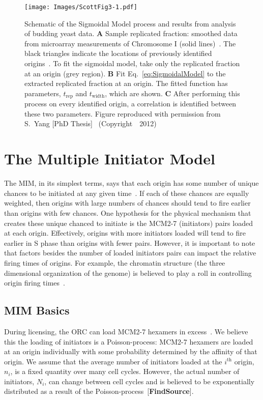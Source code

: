 {	\begin{figure}[tbh]
		\begin{center}
			\texttt{[image: Images/ScottFig3-1.pdf]}
		\end{center}
			\caption[Sigmoidal model]{\label{fig:SigmoidalModel} Schematic of the Sigmoidal Model process and results from analysis of budding yeast data.
				\textbf{A} Sample replicated fraction: smoothed data from microarray measurements of Chromosome I (solid lines)~\cite{McCuneMicroArray}.
				The black triangles indicate the locations of previously identified origins~\cite{OriginLocations}.
				To fit the sigmoidal model, take only the replicated fraction at an origin (grey region).
				\textbf{B} Fit Eq.~\ref{eq:SigmoidalModel} to the extracted replicated fraction at an origin.
				The fitted function has parameters, $t_{\text{rep}}$ and $t_{\text{width}}$, which are shown.
				\textbf{C} After performing this process on every identified origin, a correlation is identified between these two parameters.
				Figure reproduced with permission from S.~Yang [PhD Thesis]~\cite{ScottsThesis} (Copyright~\textcopyright~2012)}
	\end{figure}
	
	
	\section{The Multiple Initiator Model}
	\label{sec:MIM}
	
	The MIM, in its simplest terms, says that each origin has some number of unique chances to be initiated at any given time~\cite{ScottsThesis}.
	If each of these chances are equally weighted, then origins with large numbers of chances should tend to fire earlier than origins with few chances.
	One hypothesis for the physical mechanism that creates these unique chanced to initiate is the MCM2-7 (initiators) pairs loaded at each origin.
	Effectively, origins with more initiators loaded will tend to fire earlier in S phase than origins with fewer pairs.
	However, it is important to note that factors besides the number of loaded initiators pairs can impact the relative firing times of origins.
	For example, the chromatin structure (the three dimensional organization of the genome) is believed to play a roll in controlling origin firing times~\cite{Chromatin}.
	
		\subsection{MIM Basics}
		\label{subsec:MIMBasics}
		During licensing, the ORC can load MCM2-7 hexamers in excess~\cite{MultiMCM}.
		We believe this the loading of initiators is a Poisson-process:
		MCM2-7 hexamers are loaded at an origin individually with some probability determined by the affinity of that origin.
		We assume that the average number of initiators loaded at the $i^{\text{th}}$ origin, $n_i$, is a fixed quantity over many cell cycles.
		However, the actual number of initiators, $N_i$, can change between cell cycles and is believed to be exponentially distributed as a result of the Poisson-process~[\textbf{FindSource}].
		
}
